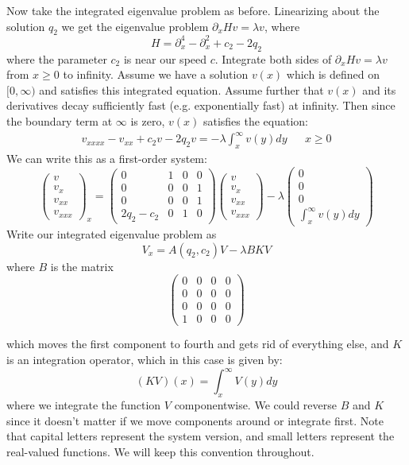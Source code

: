 \documentclass[12pt]{article}
\begin{document}
Now take the integrated eigenvalue problem as before. Linearizing about the solution $q_2$ we get the eigenvalue problem $\partial_x H v = \lambda v$, where 
\[
H = \partial_x^4 - \partial_x^2 + c_2 - 2 q_2
\]
where the parameter $c_2$ is near our speed $c$. Integrate both sides of $\partial_x H v = \lambda v$ from $x\geq 0$ to infinity. Assume we have a solution $v(x)$ which is defined on $[0, \infty)$ and satisfies this integrated equation. Assume further that $v(x)$ and its derivatives decay sufficiently fast (e.g. exponentially fast) at infinity. Then since the boundary term at $\infty$ is zero, $v(x)$ satisfies the equation:
\begin{align*}
v_{xxxx} - v_{xx} + c_2 v - 2 q_2 v = -\lambda \int_x^\infty v(y) dy && x \geq 0
\end{align*}
We can write this as a first-order system:
\[
\begin{pmatrix}v\\v_x\\v_{xx}\\v_{xxx}\end{pmatrix}_x = 
\begin{pmatrix}0 & 1 & 0 & 0 \\ 0 & 0 & 0 & 1 \\ 0 & 0 & 0 & 1 \\ 2q_2 - c_2 & 0 & 1 & 0\end{pmatrix}
\begin{pmatrix}v\\v_x\\v_{xx}\\v_{xxx}\end{pmatrix} - \lambda
\begin{pmatrix}0\\0\\0\\\int_x^\infty v(y) dy\end{pmatrix}
\]
Write our integrated eigenvalue problem as
\[
V_x = A(q_2, c_2)V - \lambda B K V
\]
where $B$ is the matrix
\[
\begin{pmatrix}0 & 0 & 0 & 0 \\0 & 0 & 0 & 0 \\0 & 0 & 0 & 0 \\1 & 0 & 0 & 0 \end{pmatrix}
\]

which moves the first component to fourth and gets rid of everything else, and $K$ is an integration operator, which in this case is given by:
\[
(KV)(x) = \int_x^\infty V(y) dy
\]
where we integrate the function $V$ componentwise. We could reverse $B$ and $K$ since it doesn't matter if we move components around or integrate first. Note that capital letters represent the system version, and small letters represent the real-valued functions. We will keep this convention throughout.\\
\end{document}
